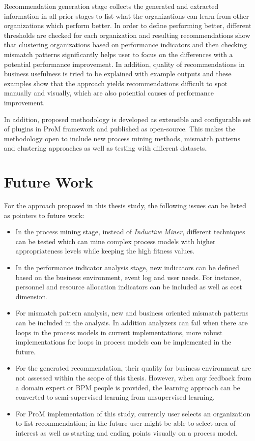 Recommendation generation stage collects the generated and extracted information in all prior stages to list what the organizations can learn from other organizations which perform better. In order to define performing better, different thresholds are checked for each organization and resulting recommendations show that clustering organizations based on performance indicators and then checking mismatch patterns significantly helps user to focus on the differences with a potential performance improvement. In addition, quality of recommendations in business usefulness is tried to be explained with example outputs and these examples show that the approach yields recommendations difficult to spot manually and visually, which are also potential causes of performance improvement.

In addition, proposed methodology is developed as extensible and configurable set of plugins in ProM framework \cite{verbeek2010prom} and published as open-source. This makes the methodology open to include new process mining methods, mismatch patterns and clustering approaches as well as testing with different datasets.

\section{Future Work}

For the approach proposed in this thesis study, the following issues can be listed as pointers to future work:
\begin{itemize}
	\item In the process mining stage, instead of \textit{Inductive Miner}, different techniques can be tested which can mine complex process models with higher appropriateness levels while keeping the high fitness values.
	\item In the performance indicator analysis stage, new indicators can be defined based on the business environment, event log and user needs. For instance, personnel and resource allocation indicators can be included as well as cost dimension.
	\item For mismatch pattern analysis, new and business oriented mismatch patterns can be included in the analysis. In addition analyzers can fail when there are loops in the process models in current implementations, more robust implementations for loops in process models can be implemented in the future.
	\item For the generated recommendation, their quality for business environment are not assessed within the scope of this thesis. However, when any feedback from a domain expert or BPM people is provided, the learning approach can be converted to semi-supervised learning from unsupervised learning.
	\item For ProM implementation of this study, currently user selects an organization to list recommendation; in the future user might be able to select area of interest as well as starting and ending points visually on a process model. 
\end{itemize}